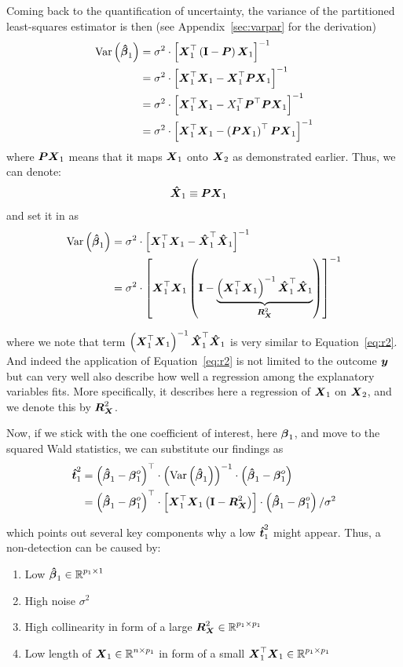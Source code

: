 \documentclass[11pt,a4paper,twoside]{book}\usepackage[]{graphicx}\usepackage[]{xcolor}
\begin{document}
Coming back to the quantification of uncertainty, the variance of the partitioned least-squares estimator is then (see Appendix~\ref{sec:varpar} for the derivation)
\begin{align*}
\var\left(\hbbeta_1\right)&=\sigma^2\cdot \left[\X_1^\top\left(\I-\bP\right)\X_1\right]^{-1}\\
&=\sigma^2\cdot \left[\X_1^\top \X_1-\X_1^\top \bP \X_1\right]^{-1}\\
&=\sigma^2\cdot \left[\X_1^\top \X_1-X_1^\top \bP^\top \bP \X_1\right]^{-1}\\
&=\sigma^2\cdot \left[\X_1^\top \X_1-\left(\bP \X_1\right)^\top \bP \X_1\right]^{-1}
\end{align*}
where $\bP\X_1$ means that it maps $\X_1$ onto $\X_2$ as demonstrated earlier. Thus, we can denote:
\begin{align*}
\hX_1&\equiv\bP\X_1
\end{align*}
and set it in as
\begin{align*}
\var\left(\hbbeta_1\right)
&=\sigma^2\cdot \left[\X_1^\top \X_1-\hX_1^\top \hX_1\right]^{-1}\\
&=\sigma^2\cdot \left[\X_1^\top \X_1\left(\I-\underbrace{\left(\X_1^\top \X_1\right)^{-1}\hX_1^\top \hX_1}_{\bR_{\X}^2}\right)\right]^{-1}
\end{align*}

where we note that term $\left(\X_1^\top \X_1\right)^{-1}\hX_1^\top \hX_1$ is very similar to  Equation~\eqref{eq:r2}. And indeed the application of Equation~\eqref{eq:r2} is not limited to the outcome $\y$ but can very well also describe how well a regression among the explanatory variables fits. More specifically, it describes here a regression of $\X_1$ on $\X_2$, and we denote this by $\bR_{\X}^2$.

Now, if we stick with the one coefficient of interest, here $\bbeta_1$, and move to the squared Wald statistics, we can substitute our findings as
\begin{align}
\hbt_1^2&=\left(\hbbeta_1-\bbeta_1^o\right)^\top\cdot\left(\var\left(\hbbeta_1\right)\right)^{-1}\cdot\left(\hbbeta_1-\bbeta_1^o\right)\nonumber\\
&=\left(\hbbeta_1-\bbeta_1^o\right)^\top\cdot\left[\X_1^\top \X_1\left(\I-\bR_{\X}^2\right)\right]\cdot\left(\hbbeta_1-\bbeta_1^o\right)/\sigma^2 \label{eq:squaredwaldpart}
\end{align}

which points out several key components why a low $\hbt_1^2$ might appear. Thus, a non-detection can be caused by:
\begin{enumerate}
\setlength\itemsep{-0.2em}
\item Low $\hbbeta_1\in\R^{ p_1\times 1}$
\item High noise $\sigma^2$
\item High collinearity in form of a large $\bR_{\X}^2\in\R^{ p_1\times p_1}$
\item Low length of $\X_1\in\R^{n\times p_1}$ in form of a small $\X_1^\top \X_1\in\R^{ p_1\times p_1}$
\end{enumerate}
\end{document}
